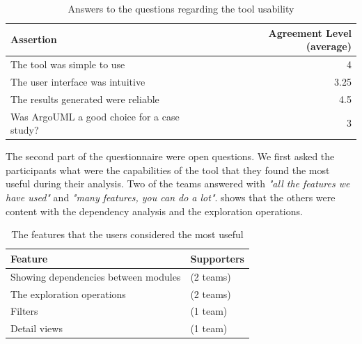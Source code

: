 \documentclass[preprint,12pt]{elsarticle}
\begin{document}
\begin{table}[ht]
\begin{center}
\begin{tabular}{p{8cm} r}
\footnotesize{Assertion} & \footnotesize{Agreement Level (average)} \\ \hline
\footnotesize{The tool was simple to use} & \footnotesize{4}  \\
\footnotesize{The user interface was intuitive} & \footnotesize{3.25} \\
\footnotesize{The results generated were reliable} & \footnotesize{4.5} \\
\footnotesize{Was ArgoUML a good choice for a case study?} & \footnotesize{3} \\ \hline
\end{tabular}
\caption{Answers to the questions regarding the tool usability }
\label{tab:postsurvey}
\end{center}
\end{table}

The second part of the questionnaire were open questions. We first asked the participants what were the capabilities of the tool that they found the most useful during their analysis. Two of the teams answered with {\em "all the features we have used"} and {\em "many features, you can do a lot"}.  shows that the others were content with the dependency analysis and the exploration operations.

\begin{table}[ht]
\begin{center}
\begin{tabular}{l l}
\footnotesize {Feature} &\footnotesize{ Supporters} \\
\hline
\footnotesize {Showing dependencies between modules} & \footnotesize{(2 teams)} \\
\footnotesize {The exploration operations} &\footnotesize{(2 teams)} \\
\footnotesize {Filters} &\footnotesize{(1 team)} \\
\footnotesize {Detail views} &\footnotesize{(1 team)} \\
\hline
\end{tabular}
\caption{The features that the users considered the most useful}
\label{tab:useful}
\end{center}
\end{table}
\end{document}
